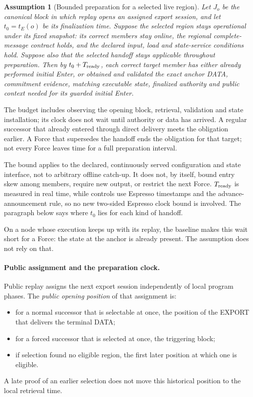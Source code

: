 \documentclass[11pt,a4paper]{article}
\newtheorem{assumption}[assumption]{Assumption}
\begin{document}
\begin{assumption}[Bounded preparation for a selected live region]
\label{ass:ready-service}
Let $J_o$ be the canonical block in which replay opens an assigned
export session, and let $t_0=t_E(o)$ be its finalization time.
Suppose the selected region stays operational under its fixed snapshot:
its correct members stay online, the regional complete-message contract
holds, and the declared input, load and state-service conditions hold.
Suppose also that the selected handoff stays applicable throughout
preparation. Then by $t_0+T_{\rm ready}$, each correct target member has
either already performed initial Enter, or obtained and validated the
exact anchor DATA, commitment evidence, matching executable state,
finalized authority and public context needed for its guarded initial
Enter.
\end{assumption}
The budget includes observing the opening block, retrieval, validation
and state installation; its clock does not wait until authority or data
has arrived. A regular successor that already entered through direct
delivery meets the obligation earlier. A Force that supersedes the
handoff ends the obligation for that target; not every Force leaves time
for a full preparation interval.

The bound applies to the declared, continuously served configuration and
state interface, not to arbitrary offline catch-up. It does not, by
itself, bound entry skew among members, require new output, or restrict
the next Force. $T_{\rm ready}$ is measured in real time, while controls
use Espresso timestamps and the advance-announcement rule, so no new
two-sided Espresso clock bound is involved. The paragraph below says where
$t_0$ lies for each kind of handoff.


On a node whose execution keeps up with its replay, the baseline makes
this wait short for a Force: the state at the anchor is already
present. The assumption does not rely on that.


\paragraph{Public assignment and the preparation clock.}
Public replay assigns the next export session independently of local
program phases. The \emph{public opening position} of that assignment is:
\begin{itemize}
\item for a normal successor that is selectable at once, the position of
the EXPORT that delivers the terminal DATA;
\item for a forced successor that is selected at once, the triggering
block;
\item if selection found no eligible region, the first later position at
which one is eligible.
\end{itemize}
A late proof of an earlier selection does not move this historical
position to the local retrieval time.
\end{document}
